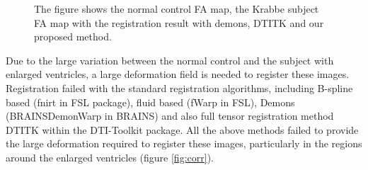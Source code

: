 \documentclass{llncs}
\begin{document}
\begin{figure}
    \label{fig:regMatch}
    \caption{The figure shows the normal control FA map, the Krabbe subject FA map with the registration result with demons, DTITK and our proposed method.}
\end{figure}

Due to the large variation between the normal control and the subject with enlarged ventricles, a large deformation field is needed to register these images. Registration failed with the standard registration algorithms, including B-spline based (fnirt in FSL package), fluid based (fWarp in FSL), Demons (BRAINSDemonWarp in BRAINS) and also full tensor registration method DTITK within the DTI-Toolkit package. All the above methods failed to provide the large deformation required to register these images, particularly in the regions around the enlarged ventricles (figure \ref{fig:corr}).
\end{document}
